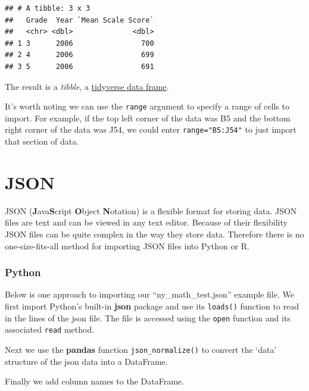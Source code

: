 \documentclass[
]{book}
\begin{document}
\begin{verbatim}
## # A tibble: 3 x 3
##   Grade  Year `Mean Scale Score`
##   <chr> <dbl>              <dbl>
## 1 3      2006                700
## 2 4      2006                699
## 3 5      2006                691
\end{verbatim}

The result is a \emph{tibble}, a \href{https://tibble.tidyverse.org/}{tidyverse data frame}.

It's worth noting we can use the \texttt{range} argument to specify a range of cells to import. For example, if the top left corner of the data was B5 and the bottom right corner of the data was J54, we could enter \texttt{range="B5:J54"} to just import that section of data.

\hypertarget{json}{%
\section{JSON}\label{json}}

JSON (\textbf{J}ava\textbf{S}cript \textbf{O}bject \textbf{N}otation) is a flexible format for storing data. JSON files are text and can be viewed in any text editor. Because of their flexibility JSON files can be quite complex in the way they store data. Therefore there is no one-size-fits-all method for importing JSON files into Python or R.

\hypertarget{python-14}{%
\subsubsection*{Python}\label{python-14}}

Below is one approach to importing our ``ny\_math\_test.json'' example file. We first import Python's built-in \textbf{json} package and use its \texttt{loads()} function to read in the lines of the json file. The file is accessed using the \texttt{open} function and its associated \texttt{read} method.

Next we use the \textbf{pandas} function \texttt{json\_normalize()} to convert the `data' structure of the json data into a DataFrame.

Finally we add column names to the DataFrame.
\end{document}
